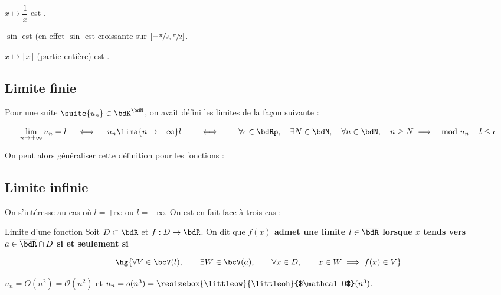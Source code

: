 \documentclass[a4paper,french,bookmarks]{article}
\newlength{\littleoh}
\newlength{\littleow}
\begin{document}
\begin{example}{}{}
    \begin{enumerate}
        \ithand $x \mapsto \dfrac{1}{x}$ est .
        
        \ithand $\sin$ est  (en effet $\sin$ est croissante sur $\left[-\sfrac{\pi}{2}, \sfrac{\pi}{2}\right]$.
        
        \ithand $x \mapsto \lfloor x \rfloor$ (partie entière) est .
    \end{enumerate}
\end{example}

\subsection{Limite finie}

Pour une suite $\suite{u_n} \in \bdK^\bdN$, on avait défini les limites de la façon suivante :

\[ \lim\limits_{n \to +\infty} u_n = l \quad \iff \quad u_n \lima{n \to +\infty} l \qquad \iff \qquad \forall \epsilon \in \bdRp, \quad \exists N \in \bdN, \quad \forall n \in \bdN,\quad n \geq N \implies \mod{u_n - l} \leq \epsilon\]

On peut alors généraliser cette définition pour les fonctions :

\subsection{Limite infinie}

On s'intéresse au cas où $l = +\infty$ ou $l = -\infty$. On est en fait face à trois cas :



\begin{definition}{Limite d'une fonction}{}
    Soit $D \subset \bdR$ et $f : D \to \bdR$. On dit que \bf{ $f(x)$ admet une limite $l \in \overline\bdR$ lorsque $x$ tends vers $a \in \overline\bdR \cap D$} si et seulement si
    
    \[\hg{\forall V \in \bcV(l),\qquad \exists W \in \bcV(a),\qquad \forall x \in D,\qquad x \in W \implies f(x) \in V}\]
\end{definition}

$u_n = O(n^2) = \mathcal{O}(n^2)$ et $u_n = o(n^3) = \resizebox{\littleow}{\littleoh}{$\mathcal O$}(n^3)$.
\end{document}

